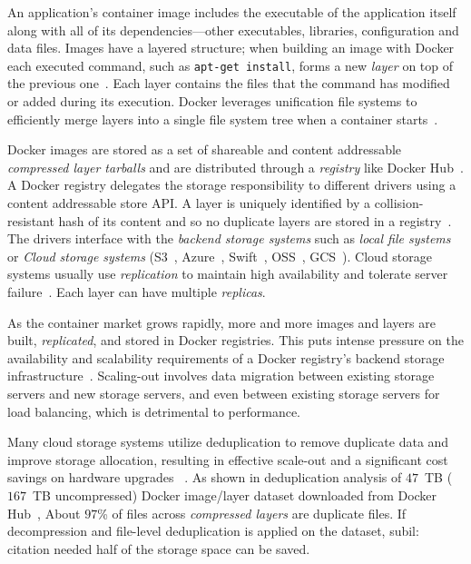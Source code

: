 An application's container image includes the executable of the application
itself along with all of its dependencies---other executables, libraries,
configuration and data files.
%
Images have a layered structure; when building an image with Docker each
executed command, such as \texttt{apt-get install}, forms a new \emph{layer} on
top of the previous one~\cite{dockerfile}.
%
Each layer contains the files that the command has modified or added during its
execution.
%
Docker leverages unification file systems to efficiently merge layers into 
a single file system tree when a container starts~\cite{docker-driver-eval}.

Docker images are stored as a set of shareable and content addressable
\emph{compressed layer tarballs} and are distributed through a \emph{registry}
like Docker Hub~\cite{docker-hub}.
%
A Docker registry delegates the storage responsibility to different drivers
using a content addressable store API.
%
A layer is uniquely identified by a collision-resistant hash of its content and
so no duplicate layers are stored in a registry~\cite{docker-hub}.
%
The drivers interface with the \emph{backend storage systems} such as
\emph{local file systems} or \emph{Cloud storage systems} (\eg S3~\cite{s3},
Azure~\cite{azuredriver}, Swift~\cite{swift}, OSS~\cite{oss}, GCS~\cite{gcs}).
%
Cloud storage systems usually use \emph{replication} to maintain high availability and tolerate server failure~\cite{Bonvin:2010:SFS:1807128.1807162}.
%
Each layer can have multiple \emph{replicas}.


%
%
As the container market grows rapidly, more and more images and layers are
built, \emph{replicated}, and stored in Docker registries.
%
This puts intense pressure on the availability and scalability requirements of
a Docker registry's backend storage infrastructure~\cite{5655241}. 
%
Scaling-out involves data migration between existing storage servers and new
storage servers, and even between existing storage servers for load balancing,
which is detrimental to performance.

%
%
%
%
Many cloud storage systems utilize deduplication to remove duplicate data and
improve storage allocation, resulting in effective scale-out and a significant
cost savings on hardware upgrades ~\cite{Ng:2012:PDD:2245276.2245361, 6753819,
5655241}.
%
As shown in deduplication analysis of $47$~TB ($167$~TB uncompressed) Docker
image/layer dataset downloaded from Docker Hub~\cite{dedupanalysis}, About
$97$\% of files across \emph{compressed layers} are duplicate files.
%
If decompression and file-level deduplication is applied on the dataset,
subil: citation needed half of the storage space can be saved.


